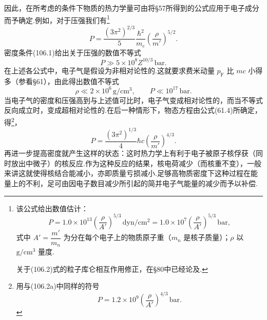 因此，在所考虑的条件下物质的热力学量可由将§57所得到的公式应用于电子成分而予确定.例如，对于压强我们有\footnote{该公式给出数值估计：
\begin{equation*}
  P=1.0\times10^{13}\left(\frac{\rho}{A'}\right)^{5/3}\,\mathrm{dyn/cm^{2}}
  =1.0\times10^{7}\left(\frac{\rho}{A'}\right)^{5/3}\,\mathrm{bar},\tag{106.2a}
\end{equation*}
式中 $A'=\dfrac{m'}{m_n}$ 为分在每个电子上的物质原子重（$m_n$ 是核子质量）；$\rho$ 以 $\mathrm{g/cm^{3}}$ 量度.\par
关于(106.2)式的粒子库仑相互作用修正，在§80中已经论及.}
\begin{equation}
  P=\frac{(3\pi^2)^{2/3}}{5}\frac{\hbar^2}{m_e}
  \left(\frac{\rho}{m'}\right)^{5/2}.
\end{equation}
密度条件(106.1)给出关于压强的数值不等式
\begin{equation*}
  P\gg5\times10^8Z^{10/3}\,\mathrm{bar}.
\end{equation*}
在上述各公式中，电子气是假设为非相对论性的.这就要求费米动量 $p_{\mathrm F}$ 比 $mc$ 小得多（参看§61），由此得出数值不等式
\begin{equation*}
  \rho\ll2\times10^6\,\mathrm{g/cm^3},\qquad
  P\ll10^{17}\,\mathrm{bar}.
\end{equation*}
当电子气的密度和压强高到与上述值可比时，电子气变成相对论性的，而当不等式反向成立时，变成超相对论性的.在后一种情形下，物态方程由公式(61.4)所确定，得\footnote{用与(106.2a)中同样的符号
\begin{equation*}
  P=1.2\times10^{9}\left(\frac{\rho}{A'}\right)^{4/3}\,\mathrm{bar}.\tag{106.3a}
\end{equation*}}，
\begin{equation}
  P=\frac{(3\pi^2)^{1/3}}{4}\hbar c
  \left(\frac{\rho}{m'}\right)^{4/3}.
\end{equation}
再进一步提高密度就产生这样的状态：这时热力学上有利于电子被原子核俘获（同时放出中微子）的核反应.作为这种反应的结果，核电荷减少（而核重不变），一般来讲这就使得核结合能减小，亦即质量亏损减小.足够高物质密度下这种过程在能量上的不利，足可由因电子数目减少所引起的简并电子气能量的减少而予以补偿.

